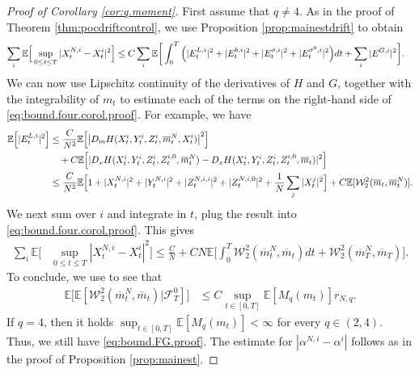\documentclass[11pt,reqno]{amsart}
\numberwithin{equation}{section}
\theoremstyle{definition}
\def\E{{\mathbb E}}
\newcommand{\sF}{\mathcal{F}}
\newcommand{\ov}{\overline}
\newcommand\cW{\mathcal W}
\def \E{\mathbb{E}}
\begin{document}
\begin{proof}[Proof of Corollary \ref{cor:q.moment}]
  First assume that $q\neq 4$.
  As in the proof of Theorem \ref{thm:pocdriftcontrol}, we use Proposition \ref{prop:mainestdrift} to obtain
  \begin{align} \label{eq:bound.four.corol.proof}
  \notag
  \sum_{ i } \E\Big[ &\sup_{0 \leq t \leq T} |X_t^{N,i} - X_t^i|^2 \Big] \leq C \sum_i \E \bigg[ \int_0^T \Big(|E_t^{L,i}|^2 + |E_t^{b,i}|^2 + |E_t^{\sigma,i}|^2 + |E^{\sigma^0,i}_t|^2 \Big) dt +  \sum_i |E^{G,i}|^2 \bigg].
\end{align}
We can now use Lipschitz continuity of the derivatives of $H$ and $G$, together with the integrability of $m_t$ to estimate each of the terms on the right-hand side of \eqref{eq:bound.four.corol.proof}. For example, we have 
\begin{align}
\notag
\E\Big[ |E_t^{L,i}|^2 \Big] &\leq \frac{C}{N^2} \E\Big[ \big|D_m H(X_t^{i}, Y_t^{i}, Z_t^{i},\ov{m}_t^N, X_t^{i})\big|^2 \Big] \\
&\quad + C \E\Big[ |D_x H(X_t^i, Y_t^i, Z_t^i, Z_t^{i,0}, \ov{m}_t^N) - D_x H(X_t^i, Y_t^i, Z_t^i, Z_t^{i,0}, \ov{m}_t)|^2 \Big] \nonumber  \\
&\leq \frac{C}{N^2} \E\Big[1 + |X_t^{N,i}|^2 + |Y_t^{N,i}|^2 + |Z_t^{N,i,i}|^2 + |Z_t^{N,i,0}|^2 + \frac{1}{N} \sum_j |X_t^j|^2 \Big] + C \E[\cW_2^2(\ov{m}_t, \ov{m}_t^N)].
\end{align}
We next sum over $i$ and integrate in $t$, plug the result into \eqref{eq:bound.four.corol.proof}. This gives 
\begin{align*}
    \sum_{ i } \E\Big[ &\sup_{0 \leq t \leq T} |X_t^{N,i} - X_t^i|^2 \Big] \leq \frac{C}{N} + CN \E\bigg[\int_0^T \cW_2^2(\ov{m}_t^N, \ov{m}_t) dt + \cW_2^2(\ov{m}^N_T,\ov{m}_T) \bigg].
\end{align*}
To conclude, we use \cite[Theorem 1]{fournier2015rate} to see that
\begin{align}
  \E\Big[\E[\cW_2^2(\ov{m}_t^N, \ov{m}_t)|\sF^0_T] \bigg] 
  \label{eq:bound.FG.proof}
  &\le C\sup_{t\in [0,T]}\E[M_q(m_t)]r_{N,q}.
\end{align}
If $q=4$, then it holds $\sup_{t\in [0,T]}\E[M_q(m_t)]<\infty$ for every $q\in (2,4)$.
Thus, we still have \eqref{eq:bound.FG.proof}.
  The estimate for $|\alpha^{N,i}-\alpha^i|$ follows as in the proof of Proposition \ref{prop:mainest}. 
\end{proof}
\end{document}
